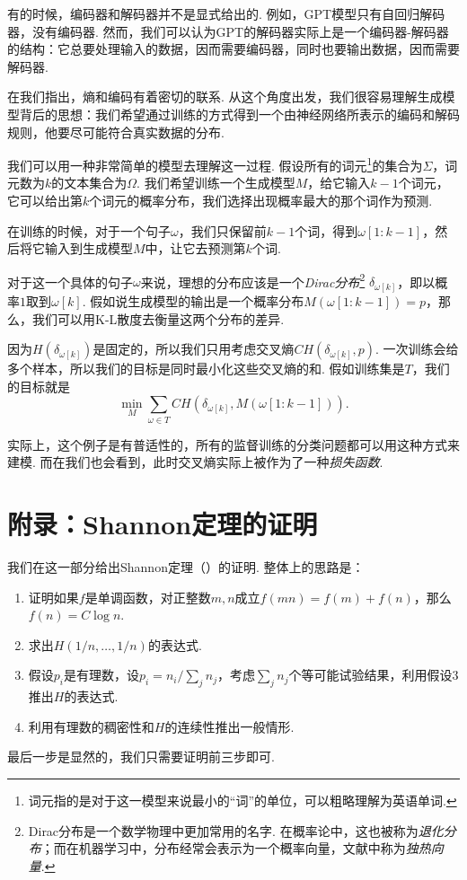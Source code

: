 有的时候，编码器和解码器并不是显式给出的. 例如，GPT模型只有自回归解码器，没有编码器. 然而，我们可以认为GPT的解码器实际上是一个编码器-解码器的结构：它总要处理输入的数据，因而需要编码器，同时也要输出数据，因而需要解码器. 

在我们指出，熵和编码有着密切的联系. 从这个角度出发，我们很容易理解生成模型背后的思想：我们希望通过训练的方式得到一个由神经网络所表示的编码和解码规则，他要尽可能符合真实数据的分布.

我们可以用一种非常简单的模型去理解这一过程. 假设所有的词元\footnote{词元指的是对于这一模型来说最小的“词”的单位，可以粗略理解为英语单词.}的集合为$\Sigma$，词元数为$k$的文本集合为$\Omega$. 我们希望训练一个生成模型$M$，给它输入$k-1$个词元，它可以给出第$k$个词元的概率分布，我们选择出现概率最大的那个词作为预测. 

在训练的时候，对于一个句子$\omega$，我们只保留前$k-1$个词，得到$\omega[1:k-1]$，然后将它输入到生成模型$M$中，让它去预测第$k$个词. 

对于这一个具体的句子$\omega$来说，理想的分布应该是一个\textit{Dirac分布}\footnote{Dirac分布是一个数学物理中更加常用的名字. 在概率论中，这也被称为\textit{退化分布}；而在机器学习中，分布经常会表示为一个概率向量，文献中称为\textit{独热向量}. } $\delta_{\omega[k]}$，即以概率$1$取到$\omega[k]$. 假如说生成模型的输出是一个概率分布$M(\omega[1:k-1])=p$，那么，我们可以用K-L散度去衡量这两个分布的差异.

因为$H(\delta_{\omega[k]})$是固定的，所以我们只用考虑交叉熵$CH(\delta_{\omega[k]},p)$. 一次训练会给多个样本，所以我们的目标是同时最小化这些交叉熵的和. 假如训练集是$T$，我们的目标就是
\[
    \min_{M} \sum_{\omega\in T} CH(\delta_{\omega[k]},M(\omega[1:k-1])).
\]

实际上，这个例子是有普适性的，所有的监督训练的分类问题都可以用这种方式来建模. 而在我们也会看到，此时交叉熵实际上被作为了一种\textit{损失函数}.

\section{附录：Shannon定理的证明}\label{sec:Shannon-thm-proofs}
我们在这一部分给出Shannon定理（）的证明. 整体上的思路是：
\begin{enumerate}
    \item 证明如果$f$是单调函数，对正整数$m,n$成立$f(mn)=f(m)+f(n)$，那么$f(n)=C\log n$.
    \item 求出$H(1/n,\dots,1/n)$的表达式.
    \item 假设$p_i$是有理数，设$p_i=n_i/\sum_j n_j$，考虑$\sum_j n_j$个等可能试验结果，利用假设3推出$H$的表达式.
    \item 利用有理数的稠密性和$H$的连续性推出一般情形.
\end{enumerate}
最后一步是显然的，我们只需要证明前三步即可.

